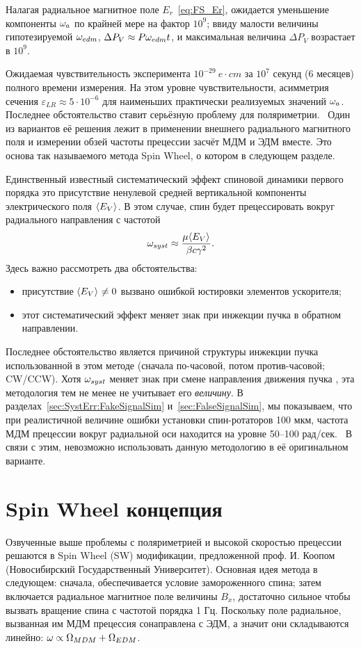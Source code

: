 \documentclass{report}
\begin{document}
Налагая радиальное магнитное поле $E_r$~\eqref{eq:FS_Er}, ожидается
уменьшение компоненты $\omega_a$ по крайней мере на фактор $10^9$; ввиду
малости величины гипотезируемой $\omega_{edm}$, $\Delta P_V \approx P
\omega_{edm} t$, и максимальная величина $\Delta P_V$ возрастает в $10^9$.

Ожидаемая чувствительность эксперимента $10^{-29}~e\cdot cm$ за $10^7$
секунд (6 месяцев) полного времени измерения. На этом уровне
чувствительности, асимметрия сечения $\varepsilon_{LR} \approx 5\cdot
10^{-6}$ для наименьших практически реализуемых значений
$\omega_a$.~\citep[стр.~18]{BNL:Deuteron2008} Последнее обстоятельство
ставит серьёзную проблему для поляриметрии.~\cite{Mane:SpinWheel} Один
из вариантов её решения лежит в применении внешнего радиального
магнитного поля и измерении обзей частоты прецессии засчёт МДМ и ЭДМ
вместе. Это основа так называемого метода Spin Wheel, о котором в
следующем разделе.

Единственный известный систематический эффект спиновой динамики
первого порядка это присутствие ненулевой средней вертикальной
компоненты электрического поля $\avg{E_V}$. В этом случае, спин будет
прецессировать вокруг радиального направления с частотой~\citep[стр.~11]{BNL:Deuteron2008}
\[
\w_{syst} \approx \frac{\mu\avg{E_V}}{\beta c\gamma^2}.
\]
Здесь важно рассмотреть два обстоятельства:
\begin{itemize}
\item присутствие $\avg{E_V}\neq 0$ вызвано ошибкой юстировки
  элементов ускорителя;
\item этот систематический эффект меняет знак при инжекции пучка в
  обратном направлении.
\end{itemize}
Последнее обстоятельство является причиной структуры инжекции пучка
использованной в этом методе (сначала по-часовой, потом
против-часовой; CW/CCW). Хотя $\omega_{syst}$ меняет знак при смене
направления движения пучка , эта методология тем не менее не учитывает
его \emph{величину}. В разделах~\ref{sec:SystErr:FakeSignalSim} и~\ref{sec:FalseSignalSim}, мы
показываем, что при реалистичной величине ошибки установки
спин-ротаторов 100 мкм, частота МДМ прецессии вокруг радиальной оси
находится на уровне 50--100 рад/сек.~\cite{Senichev:FDM} В связи с
этим, невозможно использовать данную методологию в её оригинальном варианте.

\section{Spin Wheel концепция}
Озвученные выше проблемы с поляриметрией и высокой скоростью прецессии
решаются в Spin Wheel (SW) модификации, предложенной проф. И. Коопом
(Новосибирский Государственный Университет). Основная идея метода в
следующем: сначала, обеспечивается условие замороженного спина; затем
включается радиальное магнитное поле величины $B_x$, достаточно сильное чтобы
вызвать вращение спина с частотой порядка 1 Гц. Поскольку поле
радиальное, вызванная им МДМ прецессия сонаправлена с ЭДМ, а значит
они складываются линейно: $\omega \propto \Omega_{MDM} + \Omega_{EDM}$.
\end{document}
